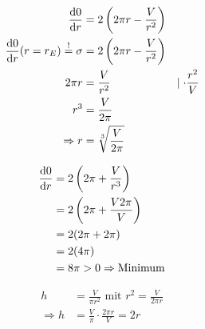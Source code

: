 \begin{align*}
	\frac{\mathop{}\!\mathrm{d} 0}{\mathop{}\!\mathrm{d} r}                               & = 2 \left( 2 \pi r - \frac{V}{r^2} \right)                            \\
	\frac{\mathop{}\!\mathrm{d} 0}{\mathop{}\!\mathrm{d} r} (r=r_E) \overset{!}{=} \sigma & = 2 \left( 2 \pi r - \frac{V}{r^2} \right)                            \\
	2 \pi r                                               & = \frac{V}{r^2}                            & \mid \cdot \frac{r^2}{V} \\
	r^3                                                   & = \frac{V}{2 \pi}                                                     \\
	\Rightarrow r                                         & = \sqrt[3]{\frac{V}{2 \pi}}
\end{align*}

\begin{align*}
	\frac{\mathop{}\!\mathrm{d} 0}{\mathop{}\!\mathrm{d} r} & = 2 \left( 2\pi + \frac{V}{r^3} \right)       \\
	                        & = 2 \left( 2 \pi + \frac{V 2 \pi}{V}  \right) \\
	                        & = 2 (2 \pi + 2 \pi)                           \\
	                        & = 2 (4 \pi)                                   \\
	                        & = 8 \pi > 0 \Rightarrow \text{Minimum}
\end{align*}

\begin{align*}
	h             & = \frac{V}{\pi r^2} \text{ mit } r^2 = \frac{V}{2 \pi r} \\
	\Rightarrow h & = \frac{V}{\pi} \cdot \frac{2 \pi r}{V} = 2r
\end{align*}
